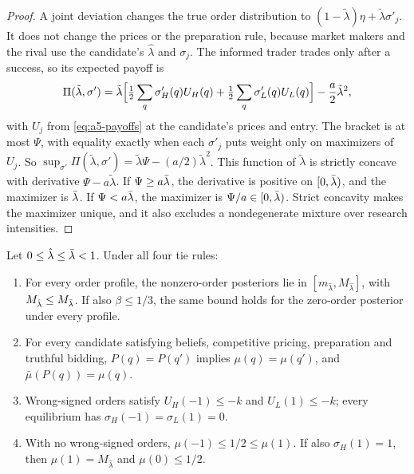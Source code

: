 \begin{proof}
A joint deviation changes the true order distribution to \((1-\tilde\lambda)\eta+\tilde\lambda\sigma'_j\). It does not change the prices or the
preparation rule, because market makers and the rival use the candidate's \(\hat\lambda\) and \(\sigma_j\).
The informed trader trades only after a success, so its expected payoff is
\[
\Pi(\tilde\lambda,\sigma')=\tilde\lambda\Bigl[\tfrac12\sum_q\sigma'_H(q)U_H(q)+\tfrac12\sum_q\sigma'_L(q)U_L(q)\Bigr]-\frac a2\tilde\lambda^2 ,
\]
with \(U_j\) from \eqref{eq:a5-payoffs} at the candidate's prices and entry. The bracket is at most \(\Psi\), with
equality exactly when each \(\sigma'_j\) puts weight only on maximizers of \(U_j\). So
\(\sup_{\sigma'}\Pi(\tilde\lambda,\sigma')=\tilde\lambda\Psi-(a/2)\tilde\lambda^2\). This function of \(\tilde\lambda\) is strictly concave with derivative \(\Psi-a\tilde\lambda\). If
\(\Psi\ge a\bar\lambda\), the derivative is positive on \([0,\bar\lambda)\), and the maximizer is \(\bar\lambda\). If \(\Psi<a\bar\lambda\), the
maximizer is \(\Psi/a\in[0,\bar\lambda)\). Strict concavity makes the maximizer unique, and it also excludes a nondegenerate
mixture over research intensities.
\end{proof}

\begin{lemma}\label{lem:a5-bounds}
Let \(0\le\hat\lambda\le\bar\lambda<1\). Under all four tie rules:
\begin{enumerate}[label=(\alph*),leftmargin=2em]
\item For every order profile, the nonzero-order posteriors lie in
\([m_{\hat\lambda},M_{\hat\lambda}]\), with \(M_{\hat\lambda}\le M_{\bar\lambda}\).
If also \(\beta\le1/3\), the same bound holds for the zero-order posterior under every profile.
\item For every candidate satisfying beliefs, competitive pricing, preparation and truthful bidding,
\(P(q)=P(q')\) implies \(\mu(q)=\mu(q')\), and \(\bar\mu(P(q))=\mu(q)\).
\item Wrong-signed orders satisfy \(U_H(-1)\le-k\) and \(U_L(1)\le-k\); every equilibrium has
\(\sigma_H(-1)=\sigma_L(1)=0\).
\item With no wrong-signed orders, \(\mu(-1)\le1/2\le\mu(1)\).
If also \(\sigma_H(1)=1\), then \(\mu(1)=M_{\hat\lambda}\) and \(\mu(0)\le1/2\).
\end{enumerate}
\end{lemma}

